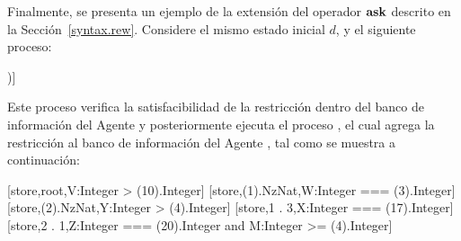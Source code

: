 Finalmente, se presenta un ejemplo de la extensi\'on del operador ${\bf ask}$ descrito en la Secci\'on~\ref{syntax.rew}. Considere el mismo estado inicial $d$, y el siguiente proceso:

\begin{maude}
[process, root, (ask< 1 >(W:Integer < 15) -> 
   < 2 . 1 >[tell(M:Integer >= 4)])]
\end{maude}

Este proceso verifica la satisfacibilidad de la restricci\'on  dentro del banco de informaci\'on del Agente  y posteriormente ejecuta el proceso , el cual agrega la restricci\'on  al banco de informaci\'on del Agente , tal como se muestra a continuaci\'on:

\begin{maude}
{ [store,root,V:Integer > (10).Integer] 
  [store,(1).NzNat,W:Integer === (3).Integer] 
  [store,(2).NzNat,Y:Integer > (4).Integer] 
  [store,1 . 3,X:Integer === (17).Integer] 
  [store,2 . 1,Z:Integer === (20).Integer 
           and M:Integer >= (4).Integer] }
\end{maude}
